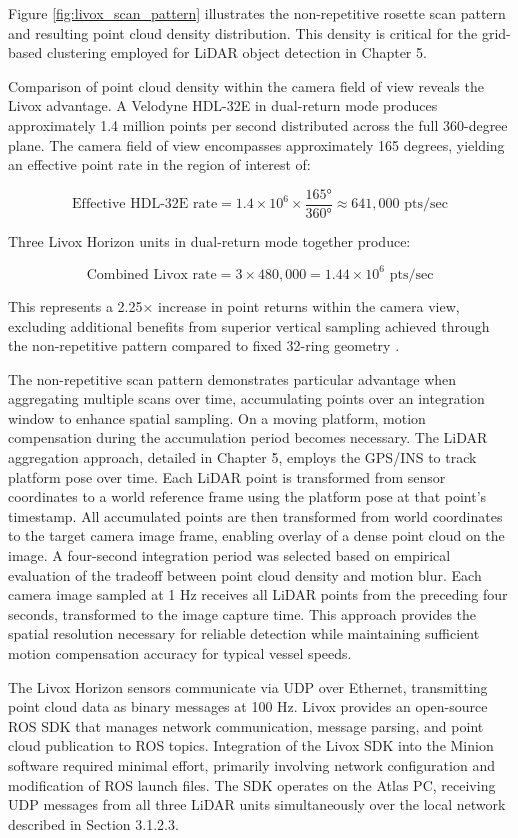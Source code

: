 \documentclass{erauthesis}
\begin{document}
Figure \ref{fig:livox_scan_pattern} illustrates the non-repetitive rosette scan pattern and resulting point cloud density distribution.
This density is critical for the grid-based clustering employed for \ac{LiDAR} object detection in Chapter 5.

Comparison of point cloud density within the camera field of view reveals the Livox advantage.
A Velodyne HDL-32E in dual-return mode produces approximately 1.4 million points per second distributed across the full 360-degree plane.
The camera field of view encompasses approximately 165 degrees, yielding an effective point rate in the region of interest of:

$$\text{Effective HDL-32E rate} = 1.4 \times 10^6 \times \frac{165°}{360°} \approx 641,000 \text{ pts/sec}$$

Three Livox Horizon units in dual-return mode together produce:

$$\text{Combined Livox rate} = 3 \times 480,000 = 1.44 \times 10^6 \text{ pts/sec}$$

This represents a 2.25× increase in point returns within the camera view, excluding additional benefits from superior vertical sampling achieved through the non-repetitive pattern compared to fixed 32-ring geometry \cite{thompson2023}.

The non-repetitive scan pattern demonstrates particular advantage when aggregating multiple scans over time, accumulating points over an integration window to enhance spatial sampling.
On a moving platform, motion compensation during the accumulation period becomes necessary.
The \ac{LiDAR} aggregation approach, detailed in Chapter 5, employs the \ac{GPS}/\ac{INS} to track platform pose over time.
Each \ac{LiDAR} point is transformed from sensor coordinates to a world reference frame using the platform pose at that point's timestamp.
All accumulated points are then transformed from world coordinates to the target camera image frame, enabling overlay of a dense point cloud on the image.
A four-second integration period was selected based on empirical evaluation of the tradeoff between point cloud density and motion blur.
Each camera image sampled at 1 Hz receives all \ac{LiDAR} points from the preceding four seconds, transformed to the image capture time.
This approach provides the spatial resolution necessary for reliable detection while maintaining sufficient motion compensation accuracy for typical vessel speeds.

The Livox Horizon sensors communicate via UDP over Ethernet, transmitting point cloud data as binary messages at 100 Hz.
Livox provides an open-source \ac{ROS} SDK that manages network communication, message parsing, and point cloud publication to \ac{ROS} topics.
Integration of the Livox SDK into the Minion software required minimal effort, primarily involving network configuration and modification of \ac{ROS} launch files.
The SDK operates on the Atlas PC, receiving UDP messages from all three \ac{LiDAR} units simultaneously over the local network described in Section 3.1.2.3.
\end{document}
